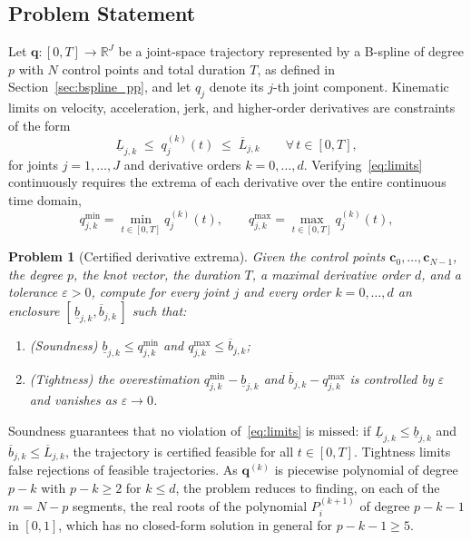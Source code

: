 \documentclass[final,5p,times,twocolumn]{elsarticle}
\newtheorem{problem}{Problem}
\theoremstyle{definition}
\begin{document}
\subsection{Problem Statement}
\label{sec:problem}

Let $\mathbf{q}:[0,T]\to\mathbb{R}^J$ be a joint-space trajectory represented by a B-spline of degree $p$ with $N$ control points and total duration $T$, as defined in Section~\ref{sec:bspline_pp}, and let $q_j$ denote its $j$-th joint component. Kinematic limits on velocity, acceleration, jerk, and higher-order derivatives are constraints of the form
\begin{equation}
  \underline{L}_{j,k}\;\le\; q_j^{(k)}(t)\;\le\;\overline{L}_{j,k}
  \qquad \forall\, t\in[0,T],
  \label{eq:limits}
\end{equation}
for joints $j=1,\dots,J$ and derivative orders $k=0,\dots,d$. Verifying~\eqref{eq:limits} continuously requires the extrema of each derivative over the entire continuous time domain,
\begin{equation}
  q_{j,k}^{\min}=\min_{t\in[0,T]} q_j^{(k)}(t),
  \qquad
  q_{j,k}^{\max}=\max_{t\in[0,T]} q_j^{(k)}(t),
  \label{eq:extrema}
\end{equation}


\begin{problem}[Certified derivative extrema]
Given the control points $\mathbf{c}_0,\dots,\mathbf{c}_{N-1}$, the degree $p$, the knot vector, the duration $T$, a maximal derivative order $d$, and a tolerance $\varepsilon>0$, compute for every joint $j$ and every order $k=0,\dots,d$ an enclosure $[\,\underline{b}_{j,k},\overline{b}_{j,k}\,]$ such that:
\begin{enumerate}
  \item \emph{(Soundness)} $\underline{b}_{j,k}\le q_{j,k}^{\min}$ and $q_{j,k}^{\max}\le\overline{b}_{j,k}$;
  \item \emph{(Tightness)} the overestimation $q_{j,k}^{\min}-\underline{b}_{j,k}$ and $\overline{b}_{j,k}-q_{j,k}^{\max}$ is controlled by $\varepsilon$ and vanishes as $\varepsilon\to 0$.
\end{enumerate}
\end{problem}

Soundness guarantees that no violation of~\eqref{eq:limits} is missed: if $\underline{L}_{j,k}\le\underline{b}_{j,k}$ and $\overline{b}_{j,k}\le\overline{L}_{j,k}$, the trajectory is certified feasible for all $t\in[0,T]$. Tightness limits false rejections of feasible trajectories. As $\mathbf{q}^{(k)}$ is piecewise polynomial of degree $p-k$ with $p-k\ge 2$ for $k\le d$, the problem reduces to finding, on each of the $m=N-p$ segments, the real roots of the polynomial $P_i^{(k+1)}$ of degree $p-k-1$ in $[0,1]$, which has no closed-form solution in general for $p-k-1\ge 5$. 
\end{document}
